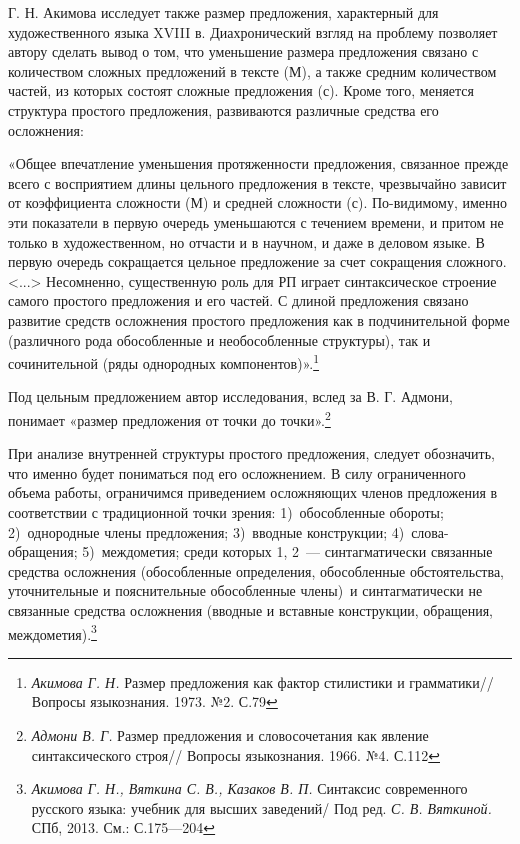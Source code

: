 \documentclass{kursa4}
\begin{document}
{      Г. Н. Акимова исследует также размер предложения, характерный для
      художественного языка XVIII в. Диахронический взгляд на проблему
      позволяет автору сделать вывод о том, что уменьшение размера
      предложения связано с количеством сложных предложений в тексте (М), а
      также средним количеством частей, из которых состоят сложные
      предложения (с). Кроме того, меняется структура простого предложения,
      развиваются различные средства его осложнения:

      «Общее впечатление уменьшения протяженности предложения, связанное
      прежде всего с восприятием длины цельного предложения в тексте,
      чрезвычайно зависит от коэффициента сложности (М) и средней сложности
      (с). По-видимому, именно эти показатели в первую очередь уменьшаются с
      течением времени, и притом не только в художественном, но отчасти и в
      научном, и даже в деловом языке. В первую очередь сокращается цельное
      предложение за счет сокращения сложного. \textless{}...\textgreater{}
      Несомненно, существенную роль для РП играет синтаксическое строение
      самого простого предложения и его частей. С длиной предложения связано
      развитие средств осложнения простого предложения как в подчинительной
      форме (различного рода обособленные и необособленные структуры), так и
      сочинительной (ряды однородных
      компонентов)».\footnote{\textit{{ Акимова Г. Н.
      }}{Размер предложения как фактор стилистики и
      грамматики// Вопросы языкознания. 1973. №2. С.79}} 

      Под цельным предложением автор исследования, вслед за В. Г. Адмони,
      понимает «размер предложения от точки до
      точки».\footnote{\textit{{ Адмони В.
      Г.}}{ Размер предложения и словосочетания как явление
      синтаксического строя// Вопросы языкознания. 1966. №4. С.112}}

      При анализе внутренней структуры простого предложения, следует
      обозначить, что именно будет пониматься под его осложнением. В силу
      ограниченного объема работы, ограничимся приведением осложняющих членов
      предложения в соответствии с традиционной точки зрения: 1)~обособленные
      обороты; 2)~однородные члены предложения; 3)~вводные конструкции;
      4)~слова-обращения; 5)~междометия; среди которых 1, 2~--- синтагматически
      связанные средства осложнения (обособленные определения, обособленные
      обстоятельства, уточнительные и пояснительные обособленные члены)~и
      синтагматически не связанные средства осложнения (вводные и вставные
      конструкции, обращения, междометия).\footnote{\textit{Акимова Г. Н.,
      Вяткина С. В., Казаков В. П. }Синтаксис современного русского языка: учебник для высших заведений/ Под ред. \textit{С. В. Вяткиной.} СПб, 2013. См.: С.175—204} 

}
\end{document}
